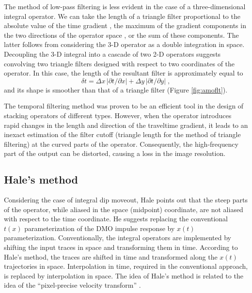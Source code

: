 

The method of low-pass filtering is less evident in the case of a
three-dimensional integral operator. We can take the length of a
triangle filter proportional to the absolute value of the time
gradient \cite{SEG-1994-1282}, the maximum of the gradient
components in the two directions of the operator space
\cite{geo64-06-17831792}, or the sum of these components. The latter
follows from considering the 3-D operator as a double integration in
space. Decoupling the 3-D integral into a cascade of two 2-D operators
suggests convolving two triangle filters designed with respect to two
coordinates of the operator. In this case, the length of the resultant
filter is approximately equal to
\begin{equation}
\delta t =      \Delta x\,|\partial t / \partial x| + 
                \Delta y\,|\partial t / \partial y|\;,
\label{eqn:dt3}
\end{equation}
and its shape is smoother than that of a triangle filter (Figure
\ref{fig:amoflt}).


The temporal filtering method was proven to be an efficient tool in
the design of stacking operators of different types. However, when the
operator introduces rapid changes in the length and direction of the
traveltime gradient, it leads to an inexact estimation of the filter
cutoff (triangle length for the method of triangle filtering) at the
curved parts of the operator. Consequently, the high-frequency part of
the output can be distorted, causing a loss in the image resolution.

\subsection{Hale's method}

Considering the case of integral dip moveout, Hale
 points out that the steep parts of the
operator, while aliased in the space (midpoint) coordinate, are not
aliased with respect to the time coordinate. He suggests replacing the
conventional $t(x)$ parameterization of the DMO impulse response by
$x(t)$ parameterization. Conventionally, the integral operators are
implemented by shifting the input traces in space and transforming
them in time.  According to Hale's method, the traces are shifted in
time and transformed along the $x(t)$ trajectories in space.
Interpolation in time, required in the conventional approach, is
replaced by interpolation in space. The idea of Hale's method is
related to the idea of the ``pixel-precise velocity transform''
\cite{Claerbout.blackwell.92}.

